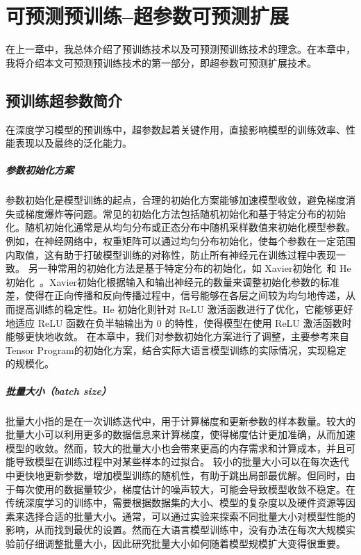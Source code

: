 
\chapter{可预测预训练--超参数可预测扩展}



在上一章中，我总体介绍了预训练技术以及可预测预训练技术的理念。在本章中，我将介绍本文可预测预训练技术的第一部分，即超参数可预测扩展技术。

\section{预训练超参数简介}

在深度学习模型的预训练中，超参数起着关键作用，直接影响模型的训练效率、性能表现以及最终的泛化能力。

\paragraph{参数初始化方案}
参数初始化是模型训练的起点，合理的初始化方案能够加速模型收敛，避免梯度消失或梯度爆炸等问题。常见的初始化方法包括随机初始化和基于特定分布的初始化。随机初始化通常是从均匀分布或正态分布中随机采样数值来初始化模型参数。例如，在神经网络中，权重矩阵可以通过均匀分布初始化，使每个参数在一定范围内取值，这有助于打破模型训练的对称性，防止所有神经元在训练过程中表现一致。
另一种常用的初始化方法是基于特定分布的初始化，如 Xavier初始化~\cite{pmlr-v9-glorot10a}和 He初始化~\cite{he2015delving}。Xavier初始化根据输入和输出神经元的数量来调整初始化参数的标准差，使得在正向传播和反向传播过程中，信号能够在各层之间较为均匀地传递，从而提高训练的稳定性。He 初始化则针对 ReLU 激活函数进行了优化，它能够更好地适应 ReLU 函数在负半轴输出为 0 的特性，使得模型在使用 ReLU 激活函数时能够更快地收敛。
在本章中，我们对参数初始化方案进行了调整，主要参考来自Tensor Program的初始化方案，结合实际大语言模型训练的实际情况，实现稳定的规模化。


\paragraph{批量大小（batch size）}
批量大小指的是在一次训练迭代中，用于计算梯度和更新参数的样本数量。较大的批量大小可以利用更多的数据信息来计算梯度，使得梯度估计更加准确，从而加速模型的收敛。然而，较大的批量大小也会带来更高的内存需求和计算成本，并且可能导致模型在训练过程中对某些样本的过拟合。
较小的批量大小可以在每次迭代中更快地更新参数，增加模型训练的随机性，有助于跳出局部最优解。但同时，由于每次使用的数据量较少，梯度估计的噪声较大，可能会导致模型收敛不稳定。在传统深度学习的训练中，需要根据数据集的大小、模型的复杂度以及硬件资源等因素来选择合适的批量大小。通常，可以通过实验来探索不同批量大小对模型性能的影响，从而找到最优的设置。然而在大语言模型训练中，没有办法在每次大规模实验前仔细调整批量大小，因此研究批量大小如何随着模型规模扩大变得很重要。

